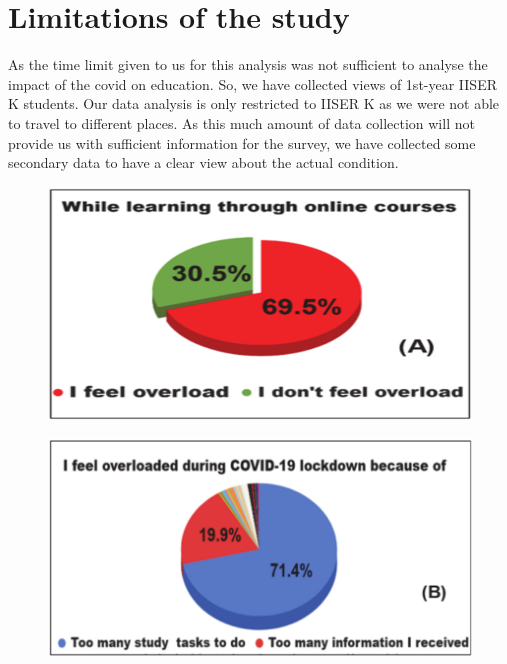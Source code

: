 \documentclass[11pt]{scrartcl}
\begin{document}
	\section{Limitations of the study}
	
	As the time limit given to us for this analysis was not sufficient to analyse the impact of the covid on education. So, we have collected views of 1st-year IISER K students. Our data analysis is only restricted to IISER K as we were not able to travel to different places. 
	As this much amount of data collection will not provide us with sufficient information for the survey, we have collected some secondary data to have a clear view about the actual condition.
	
	\begin{figure}[H]
		\centering
		\includegraphics[scale=0.6]{pic3}
	\end{figure}

	\begin{figure}[H]
		\centering
		\includegraphics[scale=0.6]{pic4}
	\end{figure}
\end{document}

